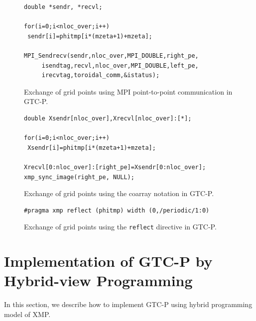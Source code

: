 \begin{figure}[t]
\centering
{\scriptsize
\begin{minipage}{8.0cm}
\begin{lstlisting}
double *sendr, *recvl;

for(i=0;i<nloc_over;i++)
 sendr[i]=phitmp[i*(mzeta+1)+mzeta];

MPI_Sendrecv(sendr,nloc_over,MPI_DOUBLE,right_pe, 
     isendtag,recvl,nloc_over,MPI_DOUBLE,left_pe, 
     irecvtag,toroidal_comm,&istatus);
\end{lstlisting}
\end{minipage}
}
\caption{Exchange of grid points using MPI point-to-point communication in GTC-P.\label{mpi}}

\bigskip

\centering
{\scriptsize
\begin{minipage}{8.0cm}
\begin{lstlisting}
double Xsendr[nloc_over],Xrecvl[nloc_over]:[*];

for(i=0;i<nloc_over;i++)
 Xsendr[i]=phitmp[i*(mzeta+1)+mzeta];

Xrecvl[0:nloc_over]:[right_pe]=Xsendr[0:nloc_over];
xmp_sync_image(right_pe, NULL);
\end{lstlisting}
\end{minipage}
}
\caption{Exchange of grid points using the coarray notation in GTC-P.\label{coarray}}

\bigskip

\centering
{\scriptsize
\begin{minipage}{8.0cm}
\begin{lstlisting}
#pragma xmp reflect (phitmp) width (0,/periodic/1:0)
\end{lstlisting}
\end{minipage}
}
\caption{Exchange of grid points using the {\tt reflect} directive in GTC-P.\label{reflect}}
\end{figure}

\section{Implementation of GTC-P by Hybrid-view Programming\label{sec3}}

In this section, we describe how to implement GTC-P using hybrid programming
model of XMP.

